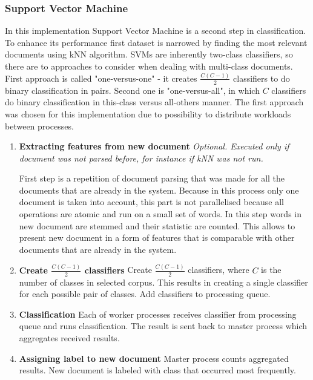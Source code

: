 \subsubsection{Support Vector Machine}
In this implementation Support Vector Machine is a second step in classification. To enhance its performance first dataset is narrowed by finding the most relevant documents using kNN algorithm. SVMs are inherently two-class classifiers, so there are to approaches to consider when dealing with multi-class documents. First approach is called "one-versus-one" - it creates \(\frac{C (C-1)}{2}\) classifiers to do binary classification in pairs. Second one is "one-versus-all", in which \(C\) classifiers do binary classification in this-class versus all-others manner. The first approach was chosen for this implementation due to possibility to distribute workloads between processes.

\begin{enumerate}
		\item \textbf{Extracting features from new document}\newline
		\textit{Optional. Executed only if document was not parsed before, for instance if kNN was not run.}
		
		First step is a repetition of document parsing that was made for all the documents that are already in the system. Because in this process only one document is taken into account, this part is not parallelised because all operations are atomic and run on a small set of words. In this step words in new document are stemmed and their statistic are counted. This allows to present new document in a form of features that is comparable with other documents that are already in the system.
		
		\item \textbf{Create \(\frac{C (C-1)}{2}\) classifiers}\newline
		Create \(\frac{C (C-1)}{2}\) classifiers, where \(C\) is the number of classes in selected corpus. This results in creating a single classifier for each possible pair of classes. Add classifiers to processing queue.
		
		\item \textbf{Classification}\newline
		Each of worker processes receives classifier from processing queue and runs classification. The result is sent back to master process which aggregates received results.
		
		\item \textbf{Assigning label to new document}\newline 
		Master process counts aggregated results. New document is labeled with class that occurred most frequently.
		
\end{enumerate}

